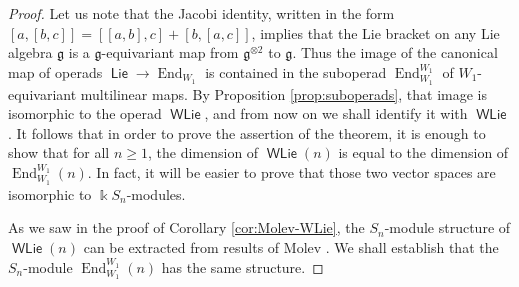 \documentclass[11pt,reqno]{amsart}
\theoremstyle{plain}
\theoremstyle{definition}
\theoremstyle{remark}
\newcommand{\bk}{\Bbbk}
\DeclareMathOperator{\Lie}{\mathsf{Lie}}
\DeclareMathOperator{\WLie}{\mathsf{WLie}}
\DeclareMathOperator{\End}{End}
\begin{document}
\begin{proof}
Let us note that the Jacobi identity, written in the form $[a,[b,c]]=[[a,b],c]+[b,[a,c]]$,    
implies that the Lie bracket on any Lie algebra $\mathfrak{g}$ is a $\mathfrak{g}$-equivariant map from $\mathfrak{g}^{\otimes 2}$ to $\mathfrak{g}$. Thus the image of the canonical map of operads $\Lie\to\End_{W_1}$ is contained in the suboperad $\End_{W_1}^{W_1}$ of $W_1$-equivariant multilinear maps. By Proposition \ref{prop:suboperads}, that image is isomorphic to the operad $\WLie$, and from now on we shall identify it with $\WLie$. It follows that in order to prove the assertion of the theorem, it is enough to show that for all $n\ge 1$, the dimension of $\WLie(n)$ is equal to the dimension of $\End_{W_1}^{W_1}(n)$. In fact, it will be easier to prove that those two vector spaces are isomorphic to $\bk S_n$-modules.

As we saw in the proof of Corollary \ref{cor:Molev-WLie}, the $S_n$-module structure of $\WLie(n)$ can be extracted from results of Molev \cite{Mo}. We shall establish that the $S_n$-module $\End_{W_1}^{W_1}(n)$ has the same structure. 


\end{proof}
\end{document}
